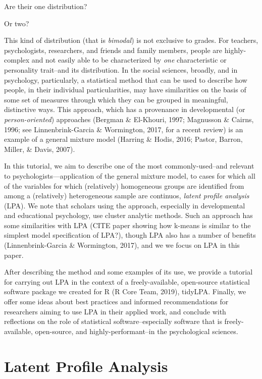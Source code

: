 \documentclass[man]{apa6}
\begin{document}
Are their one distribution?

Or two?

This kind of distribution (that is \emph{bimodal}) is not exclusive to grades. For
teachers, psychologists, researchers, and friends and family members, people are
highly-complex and not easily able to be characterized by \emph{one} characteristic
or personality trait--and its distribution. In the social sciences, broadly, and
in psychology, particularly, a statistical method that can be used to describe
how people, in their individual particularities, may have similarities on the
basis of some set of measures through which they can be grouped in meaningful,
distinctive ways. This approach, which has a provenance in developmental (or
\emph{person-oriented}) approaches (Bergman \& El-Khouri, 1997; Magnusson \&
Cairns, 1996; see Linnenbrink-Garcia \& Wormington, 2017, for a recent review) is
an example of a general mixture model (Harring \& Hodis, 2016; Pastor, Barron,
Miller, \& Davis, 2007).

In this tutorial, we aim to describe one of the most commonly-used--and relevant
to psychologists---application of the general mixture model, to cases for which
all of the variables for which (relatively) homogeneous groups are identified
from among a (relatively) heterogeneous sample are continuos, \emph{latent profile
analysis} (LPA). We note that scholars using the approach, especially in
developmental and educational psychology, use cluster analytic methods. Such an
approach has some similarities with LPA (CITE paper showing how k-means is
similar to the simplest model specification of LPA?), though LPA also has a
number of benefits (Linnenbrink-Garcia \& Wormington, 2017), and we we focus on
LPA in this paper.

After describing the method and some examples of its use, we provide a tutorial
for carrying out LPA in the context of a freely-available, open-source
statistical software package we created for R (R Core Team, 2019), tidyLPA.
Finally, we offer some ideas about best practices and informed recommendations
for researchers aiming to use LPA in their applied work, and conclude with
reflections on the role of statistical software--especially software that is
freely-available, open-source, and highly-performant--in the psychological
sciences.

\hypertarget{latent-profile-analysis}{%
\section{Latent Profile Analysis}\label{latent-profile-analysis}}
\end{document}
